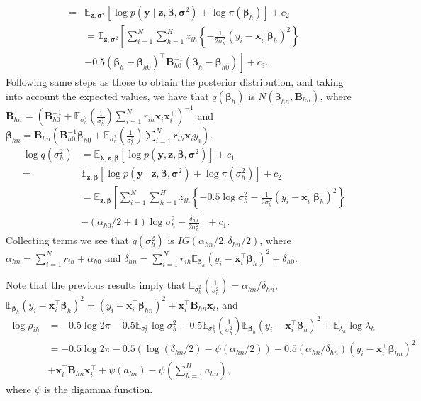 \begin{enumerate}[leftmargin=*]
\begin{align*}
	=&\mathbb{E}_{\bm{z},\bm{\sigma}^2}\left[\log p(\bm{y}\mid\bm{z},\bm{\beta},\bm{\sigma}^2)+\log \pi(\bm{\beta}_h)\right] + c_2\\
	&=\mathbb{E}_{\bm{z},\bm{\sigma}^2}\left[\sum_{i=1}^N\sum_{h=1}^Hz_{ih}\left\{-\frac{1}{2\sigma^2_h}(y_i-\bm{x}_i^{\top}\bm{\beta}_h)^2\right\}\right.\\
	&\left. -0.5(\bm{\beta}_h-\bm{\beta}_{h0})^{\top}\bm{B}_{h0}^{-1}(\bm{\beta}_h-\bm{\beta}_{h0})\right]+c_3.
\end{align*}
Following same steps as those to obtain the posterior distribution, and taking into account the expected values, we have that $q(\bm{\beta}_h)$ is $N(\bm{\beta}_{hn},\bm{B}_{hn})$, where $\bm{B}_{hn}=\left(\bm{B}_{h0}^{-1}+\mathbb{E}_{\sigma_h^2}\left(\frac{1}{\sigma^2_h}\right)\sum_{i=1}^Nr_{ih}\bm{x}_i\bm{x}_i^{\top}\right)^{-1}$ and $\bm{\beta}_{hn}=\bm{B}_{hn}\left(\bm{B}_{h0}^{-1}\bm{\beta}_{h0}+\mathbb{E}_{\sigma_h^2}\left(\frac{1}{\sigma^2_h}\right)\sum_{i=1}^Nr_{ih}\bm{x}_iy_i\right)$.
\begin{align*}
	\log q(\sigma_h^2)&=\mathbb{E}_{\bm{\lambda},\bm{z},\bm{\beta}}\left[\log p(\bm{y},\bm{z},\bm{\beta},\bm{\sigma}^2)\right] + c_1\\
	=&\mathbb{E}_{\bm{z},\bm{\beta}}\left[\log p(\bm{y}\mid\bm{z},\bm{\beta},\bm{\sigma}^2)+\log \pi({\sigma}_h^2)\right] + c_2\\
	&=\mathbb{E}_{\bm{z},\bm{\beta}}\left[\sum_{i=1}^N\sum_{h=1}^H z_{ih}\left\{-0.5\log \sigma_h^2-\frac{1}{2\sigma_h^2}(y_i-\bm{x}_i^{\top}\bm{\beta}_h)^2\right\}\right.\\
	&\left.-(\alpha_{h0}/2+1)\log \sigma_h^2-\frac{\delta_{h0}}{2\sigma_h^2}\right]+c_1.
\end{align*}
Collecting terms we see that $q(\sigma_h^2)$ is $IG(\alpha_{hn}/2,\delta_{hn}/2)$, where $\alpha_{hn}=\sum_{i=1}^Nr_{ih}+\alpha_{h0}$ and $\delta_{hn}=\sum_{i=1}^N r_{ih}\mathbb{E}_{\bm{\beta}_h}(y_i-\bm{x}_i^{\top}\bm{\beta}_h)^2+\delta_{h0}$.

Note that the previous results imply that $\mathbb{E}_{\sigma_h^2}\left(\frac{1}{\sigma^2_h}\right)=\alpha_{hn}/\delta_{hn}$, $\mathbb{E}_{\bm{\beta}_h}(y_i-\bm{x}_i^{\top}\bm{\beta}_h)^2=(y_i-\bm{x}_i^{\top}\bm{\beta}_{hn})^2+\bm{x}_i^{\top}\bm{B}_{hn}\bm{x}_i$, and
\begin{align*}
	\log \rho_{ih}&=-0.5\log 2\pi -0.5\mathbb{E}_{\sigma^2_h} \log \sigma_h^2 - 0.5 \mathbb{E}_{\sigma^2_h}\left(\frac{1}{\sigma^2_h}\right)\mathbb{E}_{\bm{\beta}_h}(y_i-\bm{x}_i^{\top}\bm{\beta}_h)^2 + \mathbb{E}_{\lambda_h}\log \lambda_h\\
	&=-0.5\log 2\pi - 0.5(\log(\delta_{hn}/2)-\psi(\alpha_{hn}/2)) - 0.5(\alpha_{hn}/\delta_{hn})(y_i-\bm{x}_i^{\top}\bm{\beta}_{hn})^2\\
	&+\bm{x}_i^{\top}\bm{B}_{hn}\bm{x}_i^{\top} + \psi(a_{hn}) - \psi\left(\sum_{h=1}^Ha_{hn}\right),
\end{align*}
where $\psi$ is the digamma function.


\end{enumerate}
